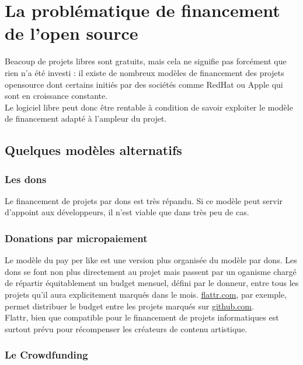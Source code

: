 \chapter{La problématique de financement de l'open source}

Beacoup de projets libres sont gratuits, mais cela ne signifie pas forcément
que rien n'a été investi : il existe de nombreux modèles de financement des
projets opensource dont certains initiés par des sociétés comme RedHat ou Apple
qui sont en croissance constante.\\ Le logiciel libre peut donc être rentable à
condition de savoir exploiter le modèle de financement adapté à l'ampleur du
projet.

\section{Quelques modèles alternatifs}

    \subsection{Les dons}

Le financement de projets par dons est très répandu.  Si ce modèle peut servir
d'appoint aux développeurs, il n'est viable que dans très peu de cas.

    \subsection{Donations par micropaiement}

Le modèle du pay per like est une version plus organisée du modèle par dons.
Les dons se font non plus directement au projet mais passent par un oganisme
chargé de répartir équitablement un budget mensuel, défini par le donneur,
entre tous les projets qu'il aura explicitement marqués dans le mois.
\url{flattr.com}, par exemple, permet distribuer le budget entre les projets
marqués sur \url{github.com}.\\ Flattr, bien que compatible pour le financement
de projets informatiques est surtout prévu pour récompenser les créateurs de
contenu artistique.

    \subsection{Le Crowdfunding}


